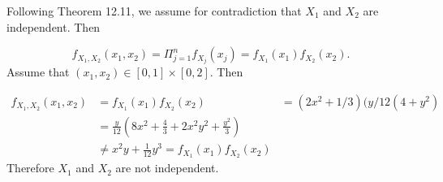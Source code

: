 
Following Theorem 12.11, we assume for contradiction that $ X_1$ and $ X_2$ are independent. Then

\[
    f_{X_1, X_2} (x_1,x_2) = \Pi_{j=1}^{n} f_{X_{j} } (x_{j} ) = f_{X_1} (x_1) f_{X_2} (x_2) 
.\] 
Assume that $ (x_1,x_2) \in [0,1] \times [0,2]$. Then 

\begin{align*}
    f_{X_{1} , X_2} (x_1,x_2) &= f_{X_1} (x_1) f_{X_2} (x_2) 
			      &=(2x^2 + 1/3)(y/12(4 + y^2)\\
			      &= \frac{y}{12} (8x^2 + \frac{4}{3} + 2x^2 y^2 + \frac{y^2}{3} ) \\
			      &\neq  x^2 y + \frac{1}{12} y^{3} = f_{X_1}(x_1) f_{X_2} (x_2)  
\end{align*}
Therefore $ X_1$ and $ X_2$ are not independent.
